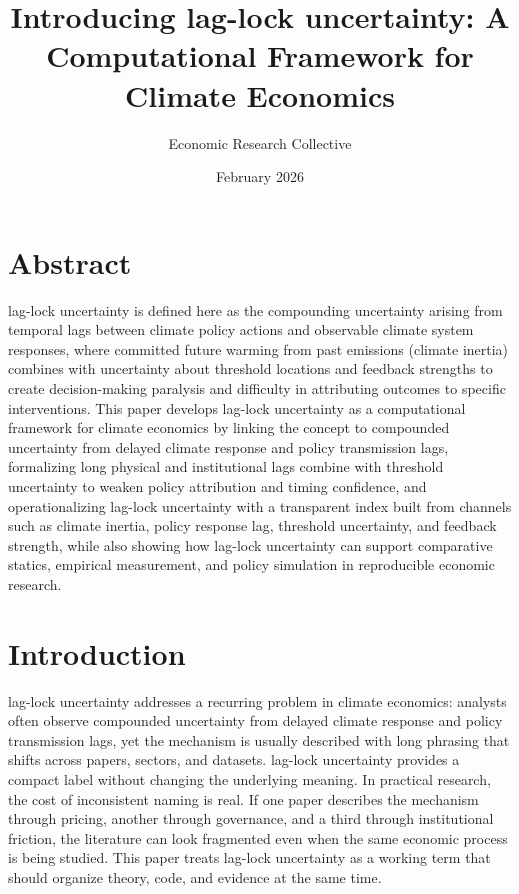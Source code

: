 \documentclass[12pt]{article}
\title{Introducing lag-lock uncertainty: A Computational Framework for Climate Economics}
\author{Economic Research Collective}
\date{February 2026}
\begin{document}
\maketitle

\section*{Abstract}
lag-lock uncertainty is defined here as the compounding uncertainty arising from temporal lags between climate policy actions and observable climate system responses, where committed future warming from past emissions (climate inertia) combines with uncertainty about threshold locations and feedback strengths to create decision-making paralysis and difficulty in attributing outcomes to specific interventions. This paper develops lag-lock uncertainty as a computational framework for climate economics by linking the concept to compounded uncertainty from delayed climate response and policy transmission lags, formalizing long physical and institutional lags combine with threshold uncertainty to weaken policy attribution and timing confidence, and operationalizing lag-lock uncertainty with a transparent index built from channels such as climate inertia, policy response lag, threshold uncertainty, and feedback strength, while also showing how lag-lock uncertainty can support comparative statics, empirical measurement, and policy simulation in reproducible economic research.

\section{Introduction}
lag-lock uncertainty addresses a recurring problem in climate economics: analysts often observe compounded uncertainty from delayed climate response and policy transmission lags, yet the mechanism is usually described with long phrasing that shifts across papers, sectors, and datasets. lag-lock uncertainty provides a compact label without changing the underlying meaning. In practical research, the cost of inconsistent naming is real. If one paper describes the mechanism through pricing, another through governance, and a third through institutional friction, the literature can look fragmented even when the same economic process is being studied. This paper treats lag-lock uncertainty as a working term that should organize theory, code, and evidence at the same time.
\end{document}
